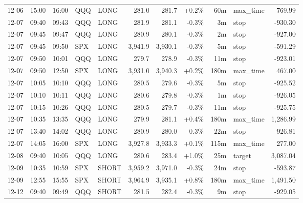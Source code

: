 \documentclass[11pt,a4paper,twoside]{article}
\begin{document}
\begin{center}
\begin{longtable}{>{\color{txtmain}}l l l l l r r r r >{\color{txtmain}}l r}
12-06 & 15:00 & 16:00 & QQQ & LONG & 281.0 & 281.7 & \textcolor{wingreen}{+0.2\%} & 60m & max\_time & \textcolor{wingreen}{769.99} \\
12-07 & 09:40 & 09:43 & QQQ & LONG & 281.9 & 281.1 & \textcolor{lossred}{-0.3\%} & 3m & stop & \textcolor{lossred}{-930.30} \\
12-07 & 09:45 & 09:47 & QQQ & LONG & 280.9 & 280.1 & \textcolor{lossred}{-0.3\%} & 2m & stop & \textcolor{lossred}{-927.00} \\
12-07 & 09:45 & 09:50 & SPX & LONG & 3,941.9 & 3,930.1 & \textcolor{lossred}{-0.3\%} & 5m & stop & \textcolor{lossred}{-591.29} \\
12-07 & 09:50 & 10:01 & QQQ & LONG & 279.7 & 278.9 & \textcolor{lossred}{-0.3\%} & 11m & stop & \textcolor{lossred}{-923.01} \\
12-07 & 09:50 & 12:50 & SPX & LONG & 3,931.0 & 3,940.3 & \textcolor{wingreen}{+0.2\%} & 180m & max\_time & \textcolor{wingreen}{467.00} \\
12-07 & 10:05 & 10:10 & QQQ & LONG & 280.5 & 279.6 & \textcolor{lossred}{-0.3\%} & 5m & stop & \textcolor{lossred}{-925.52} \\
12-07 & 10:10 & 10:11 & QQQ & LONG & 280.6 & 279.8 & \textcolor{lossred}{-0.3\%} & 1m & stop & \textcolor{lossred}{-926.05} \\
12-07 & 10:15 & 10:26 & QQQ & LONG & 280.5 & 279.7 & \textcolor{lossred}{-0.3\%} & 11m & stop & \textcolor{lossred}{-925.75} \\
12-07 & 10:35 & 13:35 & QQQ & LONG & 279.9 & 281.1 & \textcolor{wingreen}{+0.4\%} & 180m & max\_time & \textcolor{wingreen}{1,286.99} \\
12-07 & 13:40 & 14:02 & QQQ & LONG & 280.9 & 280.0 & \textcolor{lossred}{-0.3\%} & 22m & stop & \textcolor{lossred}{-926.81} \\
12-07 & 14:05 & 16:00 & SPX & LONG & 3,927.8 & 3,933.3 & \textcolor{wingreen}{+0.1\%} & 115m & max\_time & \textcolor{wingreen}{277.00} \\
12-08 & 09:40 & 10:05 & QQQ & LONG & 280.6 & 283.4 & \textcolor{wingreen}{+1.0\%} & 25m & target & \textcolor{wingreen}{3,087.04} \\
12-09 & 10:35 & 10:59 & SPX & SHORT & 3,959.2 & 3,971.0 & \textcolor{lossred}{-0.3\%} & 24m & stop & \textcolor{lossred}{-593.87} \\
12-09 & 12:55 & 15:55 & SPX & SHORT & 3,964.9 & 3,935.1 & \textcolor{wingreen}{+0.8\%} & 180m & max\_time & \textcolor{wingreen}{1,491.50} \\
12-12 & 09:40 & 09:49 & QQQ & SHORT & 281.5 & 282.4 & \textcolor{lossred}{-0.3\%} & 9m & stop & \textcolor{lossred}{-929.05} \\

\end{longtable}
\end{center}
\end{document}

